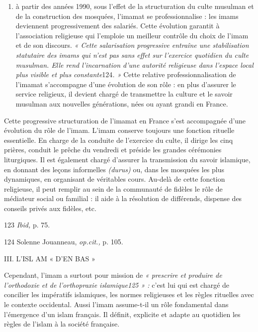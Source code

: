 \begin{enumerate}
\def\labelenumi{\arabic{enumi}.}
\setcounter{enumi}{2}
\item
  
  à partir des années 1990, sous l'effet de la structuration du culte
  musulman et de la construction des mosquées, l'imamat se
  professionnalise : les imams deviennent progressivement des salariés.
  Cette évolution garantit à l'association religieuse qui l'emploie un
  meilleur contrôle du choix de l'imam et de son discours. \emph{« Cette
  salarisation progressive entraîne une stabilisation statutaire des
  imams qui n'est pas sans effet sur l'exercice quotidien du culte
  musulman. Elle rend l'incarnation d'une autorité religieuse dans
  l'espace local plus visible et plus constante}124\emph{. »} Cette
  relative professionnalisation de l'imamat s'accompagne d'une évolution
  de son rôle : en plus d'assurer le service religieux, il devient
  chargé de transmettre la culture et le savoir musulman aux nouvelles
  générations, nées ou ayant grandi en France.
  
\end{enumerate}


Cette progressive structuration de l'imamat en France s'est accompagnée
d'une évolution du rôle de l'imam. L'imam conserve toujours une fonction
rituelle essentielle. En charge de la conduite de l'exercice du culte,
il dirige les cinq prières, conduit le prêche du vendredi et préside les
grandes cérémonies liturgiques. Il est également chargé d'assurer la
transmission du savoir islamique, en donnant des leçons informelles
\emph{(durus)} ou, dans les mosquées les plus dynamiques, en organisant
de véritables cours. Au-delà de cette fonction religieuse, il peut
remplir au sein de la communauté de fidèles le rôle de médiateur social
ou familial : il aide à la résolution de différends, dispense des
conseils privés aux fidèles, etc.

123 \emph{Ibid,} p. 75.

124 Solenne Jouanneau, \emph{op.cit.,} p. 105.

III. L'ISL AM « D'EN BAS »

Cependant, l'imam a surtout pour mission de \emph{« prescrire et
produire de l'orthodoxie et de l'orthopraxie islamique125 » :} c'est lui
qui est chargé de concilier les impératifs islamiques, les normes
religieuses et les règles rituelles avec le contexte occidental. Aussi
l'imam assume-t-il un rôle fondamental dans l'émergence d'un islam
français. Il définit, explicite et adapte au quotidien les règles de
l'islam à la société française.

